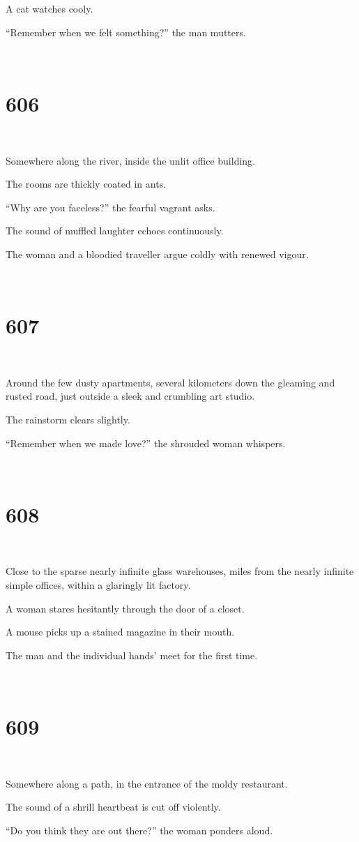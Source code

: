 \documentclass{report}
\begin{document}
A cat watches cooly.

``Remember when we felt something?'' the man mutters.

~
\chapter*{606}
~

Somewhere along the river, inside the unlit office building.

The rooms are thickly coated in ants.

``Why are you faceless?'' the fearful vagrant asks.

The sound of muffled laughter echoes continuously.

The woman and a bloodied traveller argue coldly with renewed vigour.

~
\chapter*{607}
~

Around the few dusty apartments, several kilometers down the gleaming and rusted road, just outside a sleek and crumbling art studio.

The rainstorm clears slightly.

``Remember when we made love?'' the shrouded woman whispers.

~
\chapter*{608}
~

Close to the sparse nearly infinite glass warehouses, miles from the nearly infinite simple offices, within a glaringly lit factory.

A woman stares hesitantly through the door of a closet.

A mouse picks up a stained magazine in their mouth.

The man and the individual hands' meet for the first time.

~
\chapter*{609}
~

Somewhere along a path, in the entrance of the moldy restaurant.

The sound of a shrill heartbeat is cut off violently.

``Do you think they are out there?'' the woman ponders aloud.
\end{document}
